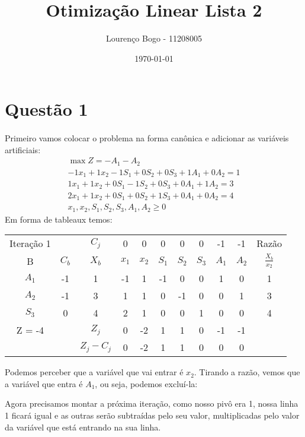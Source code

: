 \documentclass[11pt]{article}
\author{Lourenço Bogo - 11208005}
\date{\today}
\title{Otimização Linear Lista 2}
\begin{document}
\maketitle

\section{Questão 1}
\label{sec:orgc836cd8}
\paragraph{} Primeiro vamos colocar o problema na forma canônica e adicionar as variáveis artificiais:
\begin{align*}
  \max Z = -A_{1} -A_{2}\\
  -1x_{1}+1x_{2}-1S_{1}+0S_{2}+0S_{3}+1A_{1}+0A_{2} = 1\\
  1x_{1}+1x_{2}+0S_{1}-1S_{2}+0S_{3}+0A_{1}+1A_{2} = 3\\
  2x_{1}+1x_{2}+0S_{1}+0S_{2}+1S_{3}+0A_{1}+0A_{2} = 4\\
  x_{1},x_{2},S_{1},S_{2},S_{3},A_{1},A_{2} \geq 0
\end{align*}
Em forma de tableaux temos:

\begin{center}
\begin{tabular}{c c c c c c c c c c c}
Iteração 1 &  & \(C_j\) & 0 & 0 & 0 & 0 & 0 & -1 & -1 & Razão\\
B & \(C_b\) & \(X_b\) & \(x_1\) & \(x_2\) & \(S_1\) & \(S_2\) & \(S_3\) & \(A_1\) & \(A_2\) & \(\frac{X_b}{x_2}\)\\
\(A_1\) & -1 & 1 & -1 & 1 & -1 & 0 & 0 & 1 & 0 & 1\\
\(A_2\) & -1 & 3 & 1 & 1 & 0 & -1 & 0 & 0 & 1 & 3\\
\(S_3\) & 0 & 4 & 2 & 1 & 0 & 0 & 1 & 0 & 0 & 4\\
Z = -4 &  & \(Z_j\) & 0 & -2 & 1 & 1 & 0 & -1 & -1 & \\
 &  & \(Z_j-C_j\) & 0 & -2 & 1 & 1 & 0 & 0 & 0 & \\
\end{tabular}
\end{center}

Podemos perceber que a variável que vai entrar é \(x_2\). Tirando a razão, vemos que a variável que entra é \(A_1\), ou seja, podemos excluí-la:

Agora precisamos montar a próxima iteração, como nosso pivô era 1, nossa linha 1 ficará igual e as outras serão subtraídas pelo seu valor, multiplicadas pelo valor da variável que está
entrando na sua linha.
\end{document}

